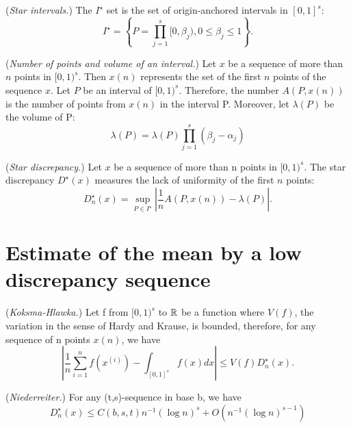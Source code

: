 \begin{definition}
(\emph{Star intervals.})
The $I^\star$ set is the set of origin-anchored
      intervals in $[0,1]^s$:
$$
        I^\star = \left\{P=\prod_{j=1}^s [0,\beta_j), 0\leq \beta_j\leq 1\right\}.
$$    
\end{definition}
    
\begin{definition}
(\emph{Number of points and volume of an interval.})
      Let $x$ be a sequence of more than $n$ points in $[0,1)^s$.
      Then $x(n)$ represents the set of the first $n$ points of the sequence $x$.
      Let $P$ be an interval of $[0,1)^s$.
      Therefore, the number $A(P,x(n))$ is the number of points 
	  from $x(n)$ in the interval P.
      Moreover, let $\lambda(P)$ be the volume of P:
$$
        \lambda(P) = \lambda(P)\prod_{j=1}^s (\beta_j-\alpha_j)
$$    
\end{definition}

\begin{definition}
(\emph{Star discrepancy.})
      Let $x$ be a sequence of more than n points in $[0,1)^s$.
      The star discrepancy $D^\star(x)$ measures the lack of uniformity of the
      first $n$ points:    
$$
        D^\star_n(x)=\sup_{P\in I^\star} \left| \frac{1}{n}A(P,x(n)) - \lambda(P) \right|.
$$    
\end{definition}


\section{Estimate of the mean by a low discrepancy sequence}

    
\begin{theorem}
(\emph{Koksma-Hlawka.})
      Let f from $[0,1)^s$ to $\mathbb{R}$ be a function where
      $V(f)$, the variation in the sense of Hardy and Krause, is bounded, therefore,
      for any sequence of n points $x(n)$, we have
$$
        \left|\frac{1}{n} \sum_{i=1}^n f\left(x^{(i)}\right) - \int_{[0,1]^s} f(x)dx \right|
        \leq V(f) D^\star_n(x).
$$    
\end{theorem}

\begin{theorem}
(\emph{Niederreiter.})
      For any (t,s)-sequence in base b, we have
$$
        D^\star_n(x) \leq C(b,s,t) n^{-1} (\log n)^s + O\left(n^{-1} (\log n)^{s-1}\right)
$$
\end{theorem}

